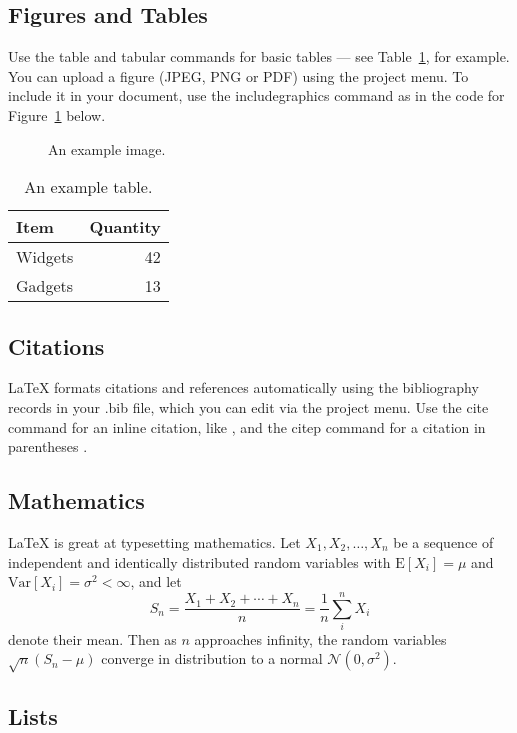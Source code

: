 \documentclass[fleqn,10pt,lineno]{wlpeerj} %
\begin{document}
\subsection*{Figures and Tables}

Use the table and tabular commands for basic tables --- see Table~\ref{tab:widgets}, for example. You can upload a figure (JPEG, PNG or PDF) using the project menu. To include it in your document, use the includegraphics command as in the code for Figure~\ref{fig:view} below.

\begin{figure}[ht]
\centering
\caption{An example image.}
\label{fig:view}
\end{figure}

\begin{table}[ht]
\centering
\begin{tabular}{l|r}
Item & Quantity \\\hline
Widgets & 42 \\
Gadgets & 13
\end{tabular}
\caption{\label{tab:widgets}An example table.}
\end{table}

\subsection*{Citations}

LaTeX formats citations and references automatically using the bibliography records in your .bib file, which you can edit via the project menu. Use the cite command for an inline citation, like \cite{Figueredo:2009dg}, and the citep command for a citation in parentheses \citep{Figueredo:2009dg}.

\subsection*{Mathematics}

\LaTeX{} is great at typesetting mathematics. Let $X_1, X_2, \ldots, X_n$ be a sequence of independent and identically distributed random variables with $\text{E}[X_i] = \mu$ and $\text{Var}[X_i] = \sigma^2 < \infty$, and let
$$S_n = \frac{X_1 + X_2 + \cdots + X_n}{n}
      = \frac{1}{n}\sum_{i}^{n} X_i$$
denote their mean. Then as $n$ approaches infinity, the random variables $\sqrt{n}(S_n - \mu)$ converge in distribution to a normal $\mathcal{N}(0, \sigma^2)$.

\subsection*{Lists}
\end{document}
